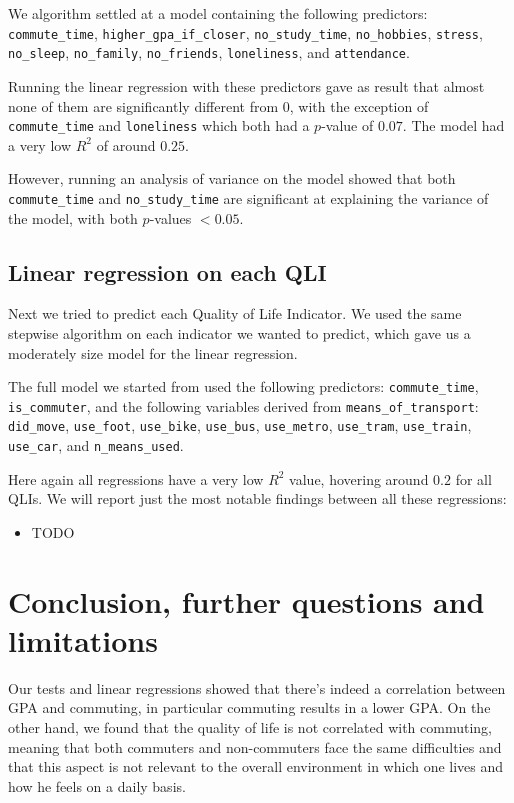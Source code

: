 \documentclass[11pt]{extarticle}
\numberwithin{table}{section}
\numberwithin{figure}{section}
\numberwithin{equation}{section}
\begin{document}
We algorithm settled at a model containing the following predictors:
\texttt{commute\_time},
\texttt{higher\_gpa\_if\_closer},
\texttt{no\_study\_time},
\texttt{no\_hobbies},
\texttt{stress},
\texttt{no\_sleep},
\texttt{no\_family},
\texttt{no\_friends},
\texttt{loneliness}, and
\texttt{attendance}.

Running the linear regression with these predictors gave as result that almost none of them
are significantly different from $0$, with the exception of
\texttt{commute\_time} and \texttt{loneliness} which both had a $p$-value of $0.07$.
The model had a very low $R^2$ of around $0.25$.

However, running an analysis of variance on the model showed that both
\texttt{commute\_time} and \texttt{no\_study\_time} are significant
at explaining the variance of the model, with both $p$-values $<0.05$.

\subsection{Linear regression on each QLI}

Next we tried to predict each Quality of Life Indicator.
We used the same stepwise algorithm on each indicator we wanted to predict,
which gave us a moderately size model for the linear regression.

The full model we started from used the following predictors:
\texttt{commute\_time},
\texttt{is\_commuter}, and the following variables derived from \texttt{means\_of\_transport}:
\texttt{did\_move},
\texttt{use\_foot},
\texttt{use\_bike},
\texttt{use\_bus},
\texttt{use\_metro},
\texttt{use\_tram},
\texttt{use\_train},
\texttt{use\_car}, and
\texttt{n\_means\_used}.

Here again all regressions have a very low $R^2$ value, hovering around $0.2$ for all QLIs.
We will report just the most notable findings between all these regressions:
\begin{itemize}
	\item TODO
\end{itemize}

\section{Conclusion, further questions and limitations}

Our tests and linear regressions showed that there’s indeed a correlation between GPA and commuting,
in particular commuting results in a lower GPA.
On the other hand, we found that the quality of life is not correlated with commuting,
meaning that both commuters and non-commuters face the same difficulties and
that this aspect is not relevant to the overall environment in which one lives and
how he feels on a daily basis.
\end{document}
